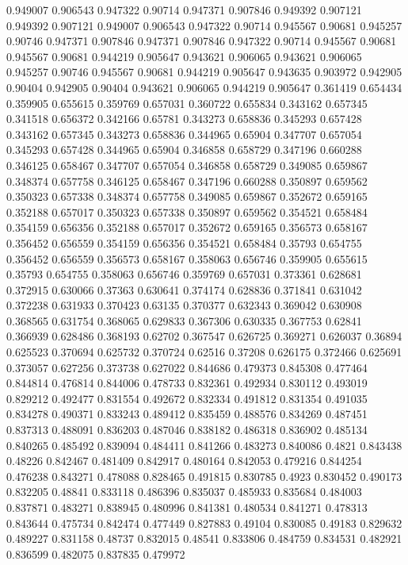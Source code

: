 0.949007 0.906543
0.947322 0.90714
0.947371 0.907846
0.949392 0.907121
0.949392 0.907121
0.949007 0.906543
0.947322 0.90714
0.945567 0.90681
0.945257 0.90746
0.947371 0.907846
0.947371 0.907846
0.947322 0.90714
0.945567 0.90681
0.945567 0.90681
0.944219 0.905647
0.943621 0.906065
0.943621 0.906065
0.945257 0.90746
0.945567 0.90681
0.944219 0.905647
0.943635 0.903972
0.942905 0.90404
0.942905 0.90404
0.943621 0.906065
0.944219 0.905647
0.361419 0.654434
0.359905 0.655615
0.359769 0.657031
0.360722 0.655834
0.343162 0.657345
0.341518 0.656372
0.342166 0.65781
0.343273 0.658836
0.345293 0.657428
0.343162 0.657345
0.343273 0.658836
0.344965 0.65904
0.347707 0.657054
0.345293 0.657428
0.344965 0.65904
0.346858 0.658729
0.347196 0.660288
0.346125 0.658467
0.347707 0.657054
0.346858 0.658729
0.349085 0.659867
0.348374 0.657758
0.346125 0.658467
0.347196 0.660288
0.350897 0.659562
0.350323 0.657338
0.348374 0.657758
0.349085 0.659867
0.352672 0.659165
0.352188 0.657017
0.350323 0.657338
0.350897 0.659562
0.354521 0.658484
0.354159 0.656356
0.352188 0.657017
0.352672 0.659165
0.356573 0.658167
0.356452 0.656559
0.354159 0.656356
0.354521 0.658484
0.35793 0.654755
0.356452 0.656559
0.356573 0.658167
0.358063 0.656746
0.359905 0.655615
0.35793 0.654755
0.358063 0.656746
0.359769 0.657031
0.373361 0.628681
0.372915 0.630066
0.37363 0.630641
0.374174 0.628836
0.371841 0.631042
0.372238 0.631933
0.370423 0.63135
0.370377 0.632343
0.369042 0.630908
0.368565 0.631754
0.368065 0.629833
0.367306 0.630335
0.367753 0.62841
0.366939 0.628486
0.368193 0.62702
0.367547 0.626725
0.369271 0.626037
0.36894 0.625523
0.370694 0.625732
0.370724 0.62516
0.37208 0.626175
0.372466 0.625691
0.373057 0.627256
0.373738 0.627022
0.844686 0.479373
0.845308 0.477464
0.844814 0.476814
0.844006 0.478733
0.832361 0.492934
0.830112 0.493019
0.829212 0.492477
0.831554 0.492672
0.832334 0.491812
0.831354 0.491035
0.834278 0.490371
0.833243 0.489412
0.835459 0.488576
0.834269 0.487451
0.837313 0.488091
0.836203 0.487046
0.838182 0.486318
0.836902 0.485134
0.840265 0.485492
0.839094 0.484411
0.841266 0.483273
0.840086 0.4821
0.843438 0.48226
0.842467 0.481409
0.842917 0.480164
0.842053 0.479216
0.844254 0.476238
0.843271 0.478088
0.828465 0.491815
0.830785 0.4923
0.830452 0.490173
0.832205 0.48841
0.833118 0.486396
0.835037 0.485933
0.835684 0.484003
0.837871 0.483271
0.838945 0.480996
0.841381 0.480534
0.841271 0.478313
0.843644 0.475734
0.842474 0.477449
0.827883 0.49104
0.830085 0.49183
0.829632 0.489227
0.831158 0.48737
0.832015 0.48541
0.833806 0.484759
0.834531 0.482921
0.836599 0.482075
0.837835 0.479972
